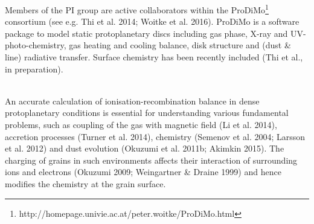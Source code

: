 \documentclass[10pt,fleqn,twoside]{article}
\newcommand{\Tcol}{\color{blue}}
\begin{document}
Members of the PI group are active collaborators within the ProDiMo\footnote{http://homepage.univie.ac.at/peter.woitke/ProDiMo.html} consortium (see e.g. Thi et al. 2014; Woitke et al. 2016).  ProDiMo is a software package to model static protoplanetary discs including gas phase, X-ray and UV-photo-chemistry, gas heating and cooling balance, disk structure and (dust \& line) radiative transfer. Surface chemistry has been recently included (Thi et al., in preparation).

\vspace{0.5em}\noindent{\Tcol\bf Ionisation in discs}\\
An accurate calculation of ionisation-recombination balance in dense protoplanetary conditions is essential for
understanding various fundamental problems, such as coupling of the gas with magnetic field (Li et al. 2014), accretion
processes (Turner et al. 2014), chemistry (Semenov et al. 2004; Larsson et al. 2012) and dust evolution (Okuzumi et al. 2011b; Akimkin 2015). The charging of grains in such environments affects their interaction of surrounding ions and electrons
(Okuzumi 2009; Weingartner \& Draine 1999) and hence modifies the chemistry at the grain surface.
\end{document}
